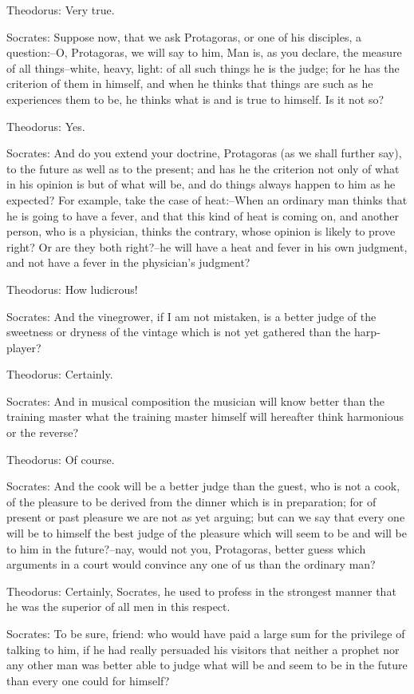 Theodorus: Very true.

Socrates: Suppose now, that we ask Protagoras, or one of his disciples,
a question:--O, Protagoras, we will say to him, Man is, as you declare,
the measure of all things--white, heavy, light: of all such things he
is the judge; for he has the criterion of them in himself, and when he
thinks that things are such as he experiences them to be, he thinks what
is and is true to himself. Is it not so?

Theodorus: Yes.

Socrates: And do you extend your doctrine, Protagoras (as we shall
further say), to the future as well as to the present; and has he the
criterion not only of what in his opinion is but of what will be, and do
things always happen to him as he expected? For example, take the case
of heat:--When an ordinary man thinks that he is going to have a fever,
and that this kind of heat is coming on, and another person, who is a
physician, thinks the contrary, whose opinion is likely to prove right?
Or are they both right?--he will have a heat and fever in his own
judgment, and not have a fever in the physician's judgment?

Theodorus: How ludicrous!

Socrates: And the vinegrower, if I am not mistaken, is a better judge of
the sweetness or dryness of the vintage which is not yet gathered than
the harp-player?

Theodorus: Certainly.

Socrates: And in musical composition the musician will know better than
the training master what the training master himself will hereafter
think harmonious or the reverse?

Theodorus: Of course.

Socrates: And the cook will be a better judge than the guest, who is
not a cook, of the pleasure to be derived from the dinner which is in
preparation; for of present or past pleasure we are not as yet arguing;
but can we say that every one will be to himself the best judge of the
pleasure which will seem to be and will be to him in the future?--nay,
would not you, Protagoras, better guess which arguments in a court would
convince any one of us than the ordinary man?

Theodorus: Certainly, Socrates, he used to profess in the strongest
manner that he was the superior of all men in this respect.

Socrates: To be sure, friend: who would have paid a large sum for the
privilege of talking to him, if he had really persuaded his visitors
that neither a prophet nor any other man was better able to judge what
will be and seem to be in the future than every one could for himself?

